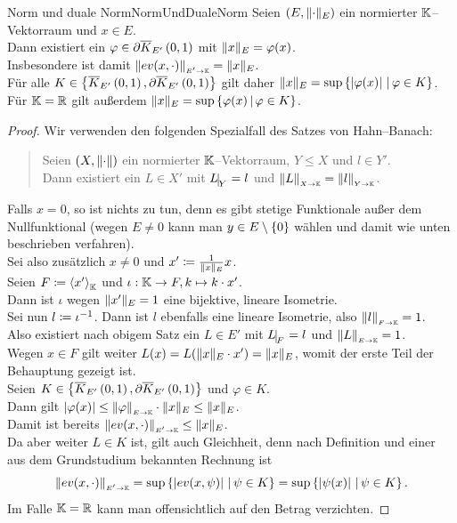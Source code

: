 \begin{lemma}{Norm und duale Norm}{NormUndDualeNorm}
Seien $(E, \lVert\cdot\rVert_E)$ ein normierter $\mathbb{K}$--Vektorraum und $x \in E$.\\
Dann existiert ein $\varphi \in \partial \overline K_{E'}\left(0, 1\right)$
mit $\lVert x\rVert_E = \varphi(x)$.\\
Insbesondere ist damit $\left\|ev(x, \cdot)\right\|_{\scriptscriptstyle{E' \rightarrow \ensuremath{\mathbb{K}}}}  = \lVert x\rVert_E$.\\
Für alle $K \in \left\{\overline K_{E'}\left(0, 1\right), \partial \overline K_{E'}\left(0, 1\right)\right\}$
gilt daher $\lVert x\rVert _ E = \sup\left\{\left|\varphi(x)\right|\,|\,\varphi \in K\right\}$.\\
Für $\mathbb{K} = \mathbb{R}$ gilt außerdem $\lVert x\rVert _ E = \sup\left\{\varphi(x)\,|\,\varphi \in K\right\}$.
\end{lemma}
\begin{proof}
Wir verwenden den folgenden Spezialfall des Satzes von Hahn--Banach:
\begin{quote}
Seien $(X, \lVert\cdot\rVert)$ ein normierter $\mathbb{K}$--Vektorraum, $Y \le X$ und
$l \in Y'$.\\
Dann existiert ein $L \in X'$ mit $\restrict{L}{Y} = l$ und $\left\|L\right\|_{\scriptscriptstyle{X \rightarrow \ensuremath{\mathbb{K}}}} = \left\|l\right\|_{\scriptscriptstyle{Y \rightarrow \ensuremath{\mathbb{K}}}}$.
\end{quote}
Falls $x = 0$, so ist nichts zu tun, denn es gibt stetige Funktionale außer dem
Nullfunktional (wegen $E \neq 0$ kann man $y \in E\setminus \left\{0\right\}$ wählen
und damit wie unten beschrieben verfahren).\\
Sei also zusätzlich $x \neq 0$ und $x' \coloneqq  \frac 1 {\lVert x\rVert _E} x$.\\
Seien $F\coloneqq \left\langle x'\right\rangle_{\mathbb{K}}$ und $\iota : \mathbb{K} \rightarrow F, k \mapsto k\cdot x'$.\\
Dann ist $\iota$ wegen $\lVert x'\rVert_E=1$ eine bijektive, lineare Isometrie.\\
Sei nun $l \coloneqq  \iota^{-1}$. Dann ist $l$ ebenfalls eine lineare Isometrie, also
$\left\|l\right\|_{\scriptscriptstyle{F \rightarrow \ensuremath{\mathbb{K}}}} = 1$.\\
Also existiert nach obigem Satz ein $L \in E'$ mit $\restrict{L}{F} = l$ und
$\left\|L\right\|_{\scriptscriptstyle{E \rightarrow \ensuremath{\mathbb{K}}}} = 1$.\\
Wegen $x \in F$ gilt weiter $L(x) = L(\lVert x\rVert_E \cdot x') = \lVert x\rVert_E$, womit
der erste Teil der Behauptung gezeigt ist.\\
Seien $K \in \left\{\overline K_{E'}\left(0, 1\right), \partial \overline K_{E'}\left(0, 1\right)\right\}$ und $\varphi \in K$.\\
Dann gilt $\left|\varphi(x)\right| \le \left\|\varphi\right\|_{\scriptscriptstyle{E \rightarrow \ensuremath{\mathbb{K}}}} \cdot \lVert x\rVert_E \le \lVert x\rVert_E$.\\
Damit ist bereits $\left\|ev(x, \cdot)\right\|_{\scriptscriptstyle{E' \rightarrow \ensuremath{\mathbb{K}}}} \le \lVert x\rVert _E$.\\
Da aber weiter $L \in K$ ist, gilt auch Gleichheit, denn nach Definition und
einer aus dem Grundstudium bekannten Rechnung ist
\[\left\|ev(x, \cdot)\right\|_{\scriptscriptstyle{E' \rightarrow \ensuremath{\mathbb{K}}}} = \sup\left\{\left|ev(x,\psi)\right|\,|\,\psi \in K\right\} =
                          \sup\left\{\left|\psi(x)\right|\,|\,\psi \in K\right\}\text.\]
Im Falle $\mathbb{K} = \mathbb{R}$ kann man offensichtlich auf den Betrag verzichten.
\end{proof}